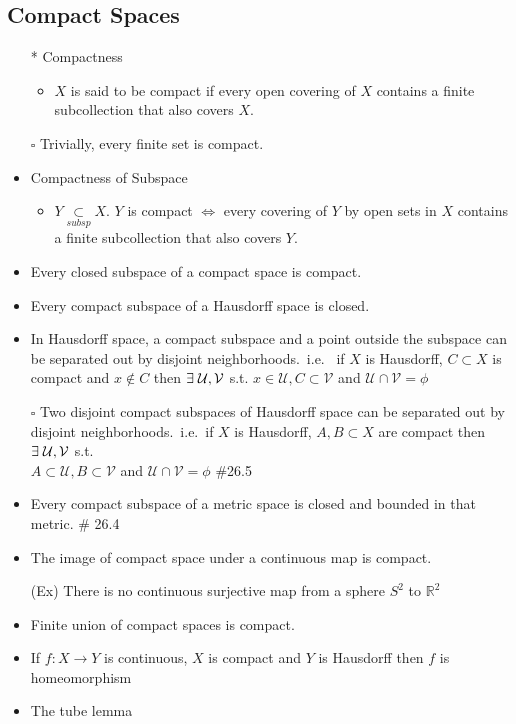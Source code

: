 \documentclass[12pt]{article}
\newcommand{\sq}{$\square$}
\newcommand{\spone}{\hspace{0.1cm}}
\newcommand{\Real}{\mathbb{R}}
\newcommand{\U}{\mathcal{U}}
\newcommand{\V}{\mathcal{V}}
\newcommand{\subsp}{\underset{subsp}{\subset}}
\newcommand{\exist}{\exists\spone}
\begin{document}
\subsection{Compact Spaces}
\smallskip
\begin{itemize}
	\item[*] Compactness
	\begin{itemize}
		\item $X$ is said to be compact if every open covering of $X$ contains a finite subcollection that also covers $X$.
	\end{itemize}
	\item[\sq] Trivially, every finite set is compact.
	\item Compactness of Subspace
	\begin{itemize}
		\item $Y\subsp X$. \; $Y$ is compact $\Leftrightarrow$ every covering of $Y$ by open sets in $X$ contains a finite subcollection that also covers $Y$.
	\end{itemize} 
	\item Every closed subspace of a compact space is compact.
	\item Every compact subspace of a Hausdorff space is closed.
	\item In Hausdorff space, a compact subspace and a point outside the subspace can be separated out by disjoint neighborhoods.\, i.e. \, if $X$ is Hausdorff, $C\subset X$ is compact and $x\notin C$ then $\exist \U, \V$ s.t. $x\in \U, C\subset \V$ and $\U\cap \V=\phi$
	\item[\sq] Two disjoint compact subspaces of Hausdorff space can be separated out by disjoint neighborhoods. \,i.e.\, if $X$ is Hausdorff, $A, B\subset X$ are compact then $\exist \U, \V$ s.t.\\ $A\subset \U, B\subset \V$ and $\U \cap \V=\phi$ \quad \#26.5
	\item Every compact subspace of a metric space is closed and bounded in that metric. \; \# 26.4
	\item The image of compact space under a continuous map is compact.
	\item[(Ex)] There is no continuous surjective map from a sphere $S^2$ to $\Real^2$
	\item Finite union of compact spaces is compact.
	\item If $f: X\rightarrow Y$ is continuous, $X$ is compact and $Y$ is Hausdorff then $f$ is homeomorphism
	\item The tube lemma
	\begin{itemize}

\end{itemize}
\end{itemize}
\end{document}
